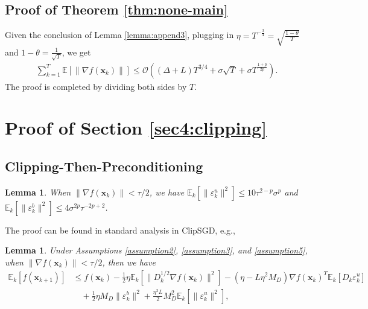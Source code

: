 \documentclass{article}
\newcommand{\bx}{\boldsymbol{x}}
\theoremstyle{plain}
\newtheorem{lemma}[theorem]{Lemma}
\theoremstyle{definition}
\theoremstyle{remark}
\begin{document}
\subsection{Proof of Theorem \ref{thm:none-main}}
Given the conclusion of Lemma \ref{lemma:append3}, plugging in $\eta=T^{-\frac{3}{4}}=\sqrt{\frac{1-\theta}{T}}$ and $1-\theta = \frac{1}{\sqrt{T}}$, we get
\begin{align*}
\sum_{k=1}^T \mathbb{E}[ \|\nabla f(\bx_k)\|] \leq \mathcal{O}\left((\Delta +L) T^{3/4} + \sigma \sqrt{T} + \sigma T^{\frac{1+p}{2p}} \right).
\end{align*}
The proof is completed by dividing both sides by $T$.
\section{Proof of Section \ref{sec4:clipping}}\label{append_D}

\subsection{Clipping-Then-Preconditioning}

\begin{lemma}
    When $\|\nabla f(\bx_k)\|<\tau/2$, we have $\mathbb{E}_k[ \| \varepsilon_k^u\|^2]\leq 10\tau^{2-p}\sigma^p$ and $\mathbb{E}_k[ \| \varepsilon_k^b\|^2]\leq 4\sigma^{2p}\tau^{-2p+2}$. 
\end{lemma}
The proof can be found in standard analysis in ClipSGD, e.g., \citet{Zhang2020Adaptive,liu2023breaking}



\begin{lemma}
    Under Assumptions \ref{assumption2}, \ref{assumption3}, and \ref{assumption5}, when $\|\nabla f(\bx_k)\|<\tau/2$, then we have
    \begin{align*}
    \mathbb{E}_k[ f(\bx_{k+1}) ] & \le f(\bx_k) - \frac{1}{2} \eta \mathbb{E}_k[ \| D_k^{1/2}\nabla f(\bx_k)\|^2 ] - (\eta - L\eta^2 M_D) \nabla f(\bx_k)^T \mathbb{E}_k[ D_k \varepsilon_k^u] \\
    & \quad + \frac{1}{2}\eta M_D  \|\varepsilon_k^b\|^2  + \frac{\eta^2 L}{2} M_D^2 \mathbb{E}_k[ \|\varepsilon_k^u\|^2],
\end{align*}
\end{lemma}
\end{document}
